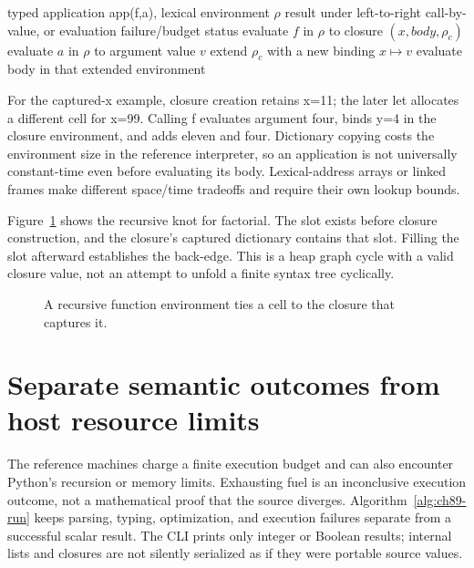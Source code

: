 \begin{algorithm}[htbp]
\caption{Evaluate strict application under lexical scope.}
\label{alg:ch89-app}
\begin{pseudocode}
\Require typed application app(f,a), lexical environment $\rho$
\Ensure result under left-to-right call-by-value, or evaluation failure/budget status
\State evaluate $f$ in $\rho$ to closure $(x,body,\rho_c)$
\State evaluate $a$ in $\rho$ to argument value $v$
\State extend $\rho_c$ with a new binding $x\mapsto v$
\State evaluate body in that extended environment
\end{pseudocode}
\end{algorithm}

For the captured-x example, closure creation retains x=11; the later let allocates a different cell for x=99.
Calling f evaluates argument four, binds y=4 in the closure environment, and adds eleven and four.
Dictionary copying costs the environment size in the reference interpreter, so an application is not universally constant-time even before evaluating its body.
Lexical-address arrays or linked frames make different space/time tradeoffs and require their own lookup bounds.

Figure~\ref{fig:ch89-recursion} shows the recursive knot for factorial.
The slot exists before closure construction, and the closure's captured dictionary contains that slot.
Filling the slot afterward establishes the back-edge.
This is a heap graph cycle with a valid closure value, not an attempt to unfold a finite syntax tree cyclically.

\begin{figure}[htbp]
\centering
{}
\caption{A recursive function environment ties a cell to the closure that captures it.}
\label{fig:ch89-recursion}
\end{figure}

\section{Separate semantic outcomes from host resource limits}
\label{sec:ch89-budget}
The reference machines charge a finite execution budget and can also encounter Python's recursion or memory limits.
Exhausting fuel is an inconclusive execution outcome, not a mathematical proof that the source diverges.
Algorithm~\ref{alg:ch89-run} keeps parsing, typing, optimization, and execution failures separate from a successful scalar result.
The CLI prints only integer or Boolean results; internal lists and closures are not silently serialized as if they were portable source values.

